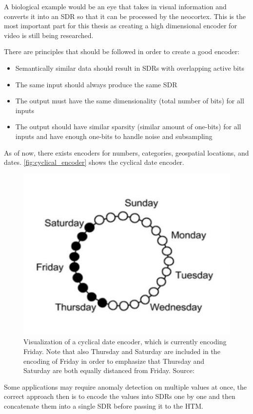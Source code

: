 A biological example would be an eye that takes in visual information and converts it into an SDR so that it can be processed by the neocortex. This is the most important part for this thesis as creating a high dimensional encoder for video is still being researched.\par
There are principles that should be followed in order to create a good encoder:
\begin{itemize}
    \item Semantically similar data should result in SDRs with overlapping active bits
    \item The same input should always produce the same SDR
    \item The output must have the same dimensionality (total number of bits) for all inputs
    \item The output should have similar sparsity (similar amount of one-bits) for all inputs and have enough one-bits to handle noise and subsampling
\end{itemize}
As of now, there exists encoders for numbers, categories, geospatial locations, and dates. \autoref{fig:cyclical_encoder} shows the cyclical date encoder.
\begin{figure}[H]
    \centering
    \includegraphics[width=0.55\linewidth]{resources/related_works/cyclical_encoder.png}
    \caption{Visualization of a cyclical date encoder, which is currently encoding Friday. Note that also Thursday and Saturday are included in the encoding of Friday in order to emphasize that Thursday and Saturday are both equally distanced from Friday. Source: \cite{BAMI}}
    \label{fig:cyclical_encoder}
\end{figure}
Some applications may require anomaly detection on multiple values at once, the correct approach then is to encode the values into SDRs one by one and then concatenate them into a single SDR before passing it to the HTM.
